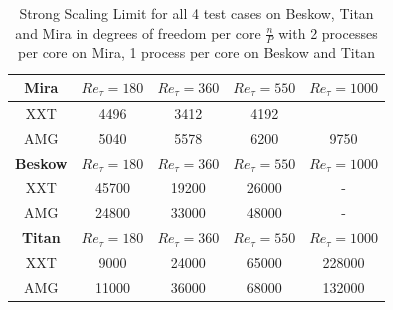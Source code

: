 \documentclass{sig-alternate}
\begin{document}
\begin{table}  
  \caption{Strong Scaling Limit for all 4 test cases on Beskow, Titan and Mira
  in degrees of freedom per core $\frac{n}{P}$ with 2 processes per core on Mira, 1 process per core on Beskow and Titan}
  \begin{tabular}{c||cccc}
    \hline
    \hline
    {\bf Mira}
    &$Re_{\tau} = 180$&$Re_{\tau} = 360$&$Re_{\tau} = 550$&$Re_{\tau} = 1000$\\
    \hline
    XXT&4496&3412&4192&\\
    AMG&5040&5578&6200&9750\\
    \hline
    \hline
    {\bf Beskow}
    &$Re_{\tau} = 180$&$Re_{\tau} = 360$&$Re_{\tau} = 550$&$Re_{\tau} = 1000$\\
    \hline
    XXT&45700&19200&26000& - \\
    AMG&24800&33000&48000& - \\
    \hline
    \hline
    {\bf Titan}
    &$Re_{\tau} = 180$&$Re_{\tau} = 360$&$Re_{\tau} = 550$&$Re_{\tau} = 1000$\\
    \hline
    XXT&9000&24000&65000&228000\\
    AMG&11000&36000&68000&132000\\
    \hline
    \hline
  \end{tabular}
  \label{tab:stronglimit}
\end{table}

% 
\end{document}
